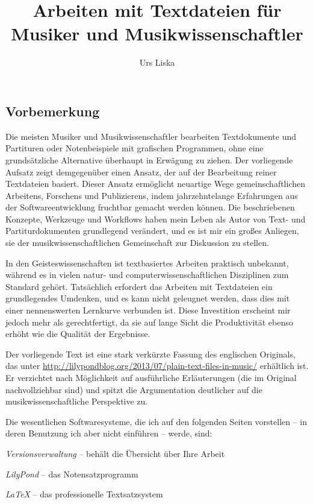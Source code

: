 \documentclass[DIV=12]{scrreprt}
\begin{document}
\title{Arbeiten mit Textdateien für Musiker und Musikwissenschaftler}
\author{Urs Liska}
\maketitle

\subsection*{Vorbemerkung}
Die meisten Musiker und Musikwissenschaftler bearbeiten Textdokumente und Partituren oder Notenbeispiele mit grafischen Programmen, ohne eine grundsätzliche Alternative überhaupt in Erwägung zu ziehen.
Der vorliegende Aufsatz zeigt demgegenüber einen Ansatz, der auf der Bearbeitung reiner Textdateien basiert.
Dieser Ansatz ermöglicht neuartige Wege gemeinschaftlichen Arbeitens, Forschens und Publizierens, indem jahrzehntelange Erfahrungen aus der Softwareentwicklung fruchtbar gemacht werden können.
Die beschriebenen Konzepte, Werkzeuge und Workflows haben mein Leben als Autor von Text- und Partiturdokumenten grundlegend verändert, und es ist mir ein großes Anliegen, sie der musikwissenschaftlichen Gemeinschaft zur Diskussion zu stellen.

In den Geisteswissenschaften ist textbasiertes Arbeiten praktisch unbekannt, während es in vielen natur- und computerwissenschaftlichen Disziplinen zum Standard gehört.
Tatsächlich erfordert das Arbeiten mit Textdateien ein grundlegendes Umdenken, und es kann nicht geleugnet werden, dass dies mit einer nennenswerten Lernkurve verbunden ist.
Diese Investition erscheint mir jedoch mehr als gerechtfertigt, da sie auf lange Sicht die Produktivität ebenso erhöht wie die Qualität der Ergebnisse.

Der vorliegende Text ist eine stark verkürzte Fassung des englischen Originals, das unter \url{http://lilypondblog.org/2013/07/plain-text-files-in-music/} erhältlich ist.
Er verzichtet nach Möglichkeit auf ausführliche Erläuterungen (die im Original nachvollziehbar sind) und spitzt die Argumentation deutlicher auf die musikwissenschaftliche Perspektive zu.

Die wesentlichen Softwaresysteme, die ich auf den folgenden Seiten vorstellen -- in deren Benutzung ich aber nicht einführen -- werde, sind:

\begin{itemize*}
\item \emph{Versionsverwaltung} -- behält die Übersicht über Ihre Arbeit
\item \emph{LilyPond} -- das Notensatzprogramm
\item \emph{\LaTeX} -- das professionelle Textsatzsystem
\end{itemize*}
\end{document}
